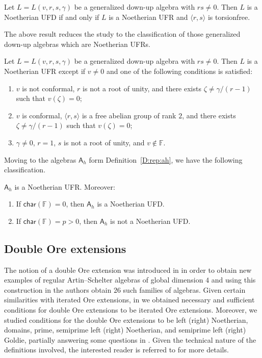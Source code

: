 \documentclass{commat}
\newcommand{\FF}{\mathbb{F}}
\newcommand{\A}{\mathsf{A}}
\newcommand\chara{\mathsf {char}}
\begin{document}
\begin{theorem}[\cite{LL13}]\label{mainUFD}
	Let $L=L(v, r, s, \gamma)$ be a generalized down-up algebra with $rs \neq 0$. Then $L$ is a Noetherian UFD if and only if $L$ is a Noetherian UFR and $\langle r, s \rangle$ is torsionfree.
\end{theorem}

The above result reduces the study to the classification of those generalized down-up algebras which are Noetherian UFRs.

\begin{theorem}[\cite{LL13}]\label{mainUFR}
	Let $L=L(v, r, s, \gamma)$ be a generalized down-up algebra with $rs \neq 0$. Then $L$ is a Noetherian UFR  except if $v\neq 0$ and one of the following conditions is satisfied:
	\begin{enumerate}
		\item $v$ is not conformal, $r$ is not a root of unity, and there exists $\zeta\neq \gamma/(r-1)$ such that $v(\zeta)=0$;
		\item $v$ is conformal, $\langle r, s\rangle$ is a free abelian group of rank $2$, and there exists $\zeta\neq \gamma/(r-1)$ such that $v(\zeta)=0$;
		\item $\gamma\neq 0$, $r=1$, $s$ is not a root of unity, and $v\notin \FF$.
	\end{enumerate}
\end{theorem}

Moving to the algebras $\A_h$ form Definition~\ref{D:rep:ah}, we have the following classification.

\begin{theorem}
	$\A_{h}$ is a Noetherian UFR. Moreover:
	\begin{enumerate}[label=(\alph*)]
		\item  If $\chara(\FF) =  0$, then $\A_{h}$ is a Noetherian UFD.
		\item If $\chara(\FF) = p > 0$, then $\A_{h}$ is not a Noetherian UFD.
	\end{enumerate}
\end{theorem}

\subsection{Double Ore extensions}\label{SS:rt:doe}


The notion of a double Ore extension was introduced in \cite{ZZ08} in order to obtain new examples of regular Artin--Schelter algebras of global dimension $4$ and using this construction in \cite{ZZ09} the authors obtain $26$ such families of algebras. Given certain similarities with iterated Ore extensions, in \cite{CLM11} we obtained necessary and sufficient conditions for double Ore extensions to be iterated Ore extensions. Moreover, we studied conditions for the double Ore extensions to be left (right) Noetherian, domains, prime, semiprime left (right) Noetherian, and semiprime left (right) Goldie, partially answering some questions in \cite{ZZ08}. Given the technical nature of the definitions involved, the interested reader is referred to \cite{CLM11} for more details.
\end{document}
